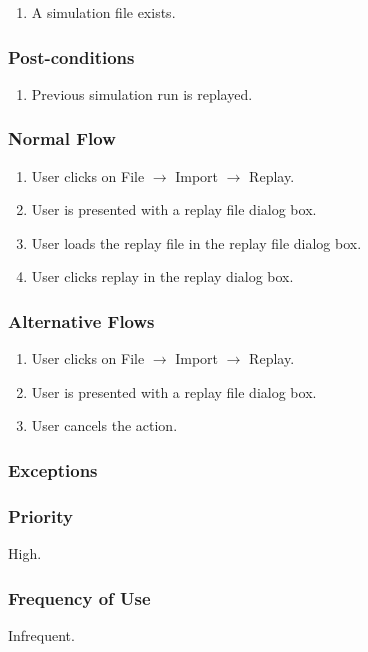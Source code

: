 \documentclass[a4paper,11pt,titlepage]{article}
\newcommand{\ra}{
  $\rightarrow$ \xspace
}
\begin{document}
\begin{enumerate}
  \item A simulation file exists.
\end{enumerate}

\subsubsection{Post-conditions}

\begin{enumerate}
  \item  Previous simulation run is replayed.     
\end{enumerate}

\subsubsection{Normal Flow}
\begin{enumerate}
  \item User clicks on File \ra Import \ra Replay.
  \item  User is presented with a replay file dialog box.
  \item User loads the replay file in the replay file dialog box.
  \item User clicks replay in the replay dialog box.
\end{enumerate}

\subsubsection{Alternative Flows}

\begin{enumerate}
  \item User clicks on File \ra Import \ra Replay.
  \item User is presented with a replay file dialog box.
  \item User cancels the action.
\end{enumerate} 

\subsubsection{Exceptions}

\subsubsection{Priority}
High.

\subsubsection{Frequency of Use}
Infrequent.
\end{document}
